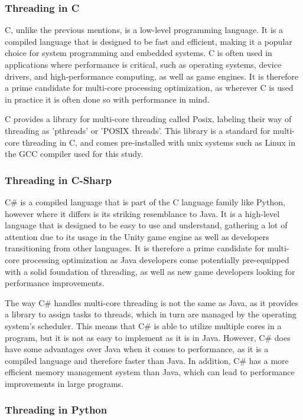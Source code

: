 \documentclass[12pt,a4paper]{article}
\begin{document}
\subsubsection{Threading in C}

C, unlike the previous mentions, is a low-level programming language. It is a compiled language that is designed to be fast and efficient, making it a popular choice for system programming and embedded systems. C is often used in applications where performance is critical, such as operating systems, device drivers, and high-performance computing, as well as game engines. It is therefore a prime candidate for multi-core processing optimization, as wherever C is used in practice it is often done so with performance in mind.

C provides a library for multi-core threading called Posix, labeling their way of threading as 'pthreads' or 'POSIX threads'. This library is a standard for multi-core threading in C, and comes pre-installed with unix systems such as Linux in the GCC compiler used for this study.

\subsubsection{Threading in C-Sharp}

C\# is a compiled language that is part of the C language family like Python, however where it differs is its striking resemblance to Java. It is a high-level language that is designed to be easy to use and understand, gathering a lot of attention due to its usage in the Unity game engine as well as developers transitioning from other languages. It is therefore a prime candidate for multi-core processing optimization as Java developers come potentially pre-equipped with a solid foundation of threading, as well as new game developers looking for performance improvements.

The way C\# handles multi-core threading is not the same as Java, as it provides a library to assign tasks to threads, which in turn are managed by the operating system's scheduler. This means that C\# is able to utilize multiple cores in a program, but it is not as easy to implement as it is in Java. However, C\# does have some advantages over Java when it comes to performance, as it is a compiled language and therefore faster than Java. In addition, C\# has a more efficient memory management system than Java, which can lead to performance improvements in large programs.

\subsubsection{Threading in Python}
\end{document}
